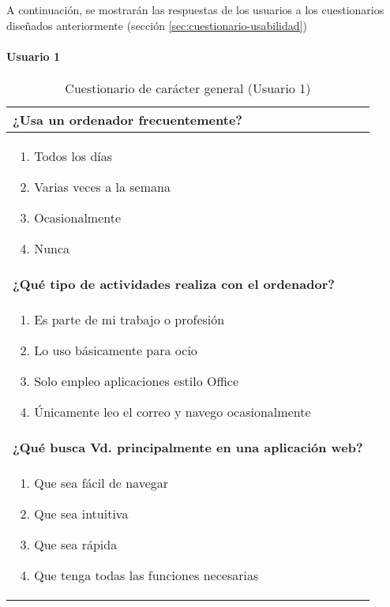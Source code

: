 A continuación, se mostrarán las respuestas de los usuarios a los cuestionarios diseñados anteriormente (sección \ref{sec:cuestionario-usabilidad})
\paragraph*{Usuario 1}
\begin{table}[H]
\centering
\caption{Cuestionario de carácter general (Usuario 1)}
\begin{tabular}{p{36em}}
\toprule
\rowcolor[rgb]{ .949,  .949,  .949} \textbf{¿Usa un ordenador frecuentemente?} \\ \midrule
\vspace{-4mm}
\begin{enumerate}
\item \colorbox{blue!30}{Todos los días}
\item Varias veces a la semana
\item Ocasionalmente
\item Nunca
\end{enumerate} \\ \midrule
\rowcolor[rgb]{ .949,  .949,  .949} \textbf{¿Qué tipo de actividades realiza con el ordenador?} \\ \midrule
\vspace{-4mm}
\begin{enumerate}
\item Es parte de mi trabajo o profesión
\item \colorbox{blue!30}{Lo uso básicamente para ocio}
\item Solo empleo aplicaciones estilo Office
\item Únicamente leo el correo y navego ocasionalmente
\end{enumerate} \\ \midrule
\rowcolor[rgb]{ .949,  .949,  .949} \textbf{¿Qué busca Vd. principalmente en una aplicación web?} \\ \midrule
\vspace{-4mm}
\begin{enumerate}
\item \colorbox{blue!30}{Que sea fácil de navegar}
\item Que sea intuitiva
\item Que sea rápida
\item Que tenga todas las funciones necesarias
\end{enumerate} \\ \bottomrule
\end{tabular}
\end{table}

